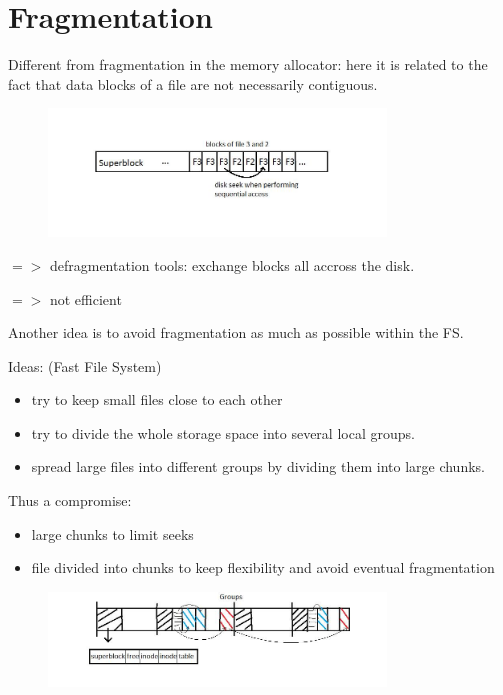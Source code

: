 \documentclass[a4paper,10pt]{report}
\newlength{\larg}
\begin{document}
\section{Fragmentation}

Different from fragmentation in the memory allocator: here it is related to the fact that data blocks of a file are not necessarily contiguous.

 \begin{figure}[h!]
  \begin{center}
    \includegraphics[width=0.8\textwidth]{fragmentation.jpg}
  \end{center}
\end{figure}

$=>$ defragmentation tools: exchange blocks all accross the disk.

$=>$ not efficient

Another idea is to avoid fragmentation as much as possible within the FS.

Ideas: (Fast File System)
\begin{itemize}
  \item  try to keep small files close to each other
  \item try to divide the whole storage space into several local groups.
  \item spread large files into different groups by dividing them into large chunks.
\end{itemize}

Thus a compromise:
\begin{itemize}
  \item large chunks to limit seeks
  \item file divided into chunks to keep flexibility and avoid eventual fragmentation
\end{itemize}

\begin{figure}[h!]
  \begin{center}
    \includegraphics[width=0.8\textwidth]{fragmentation_2.jpg}
  \end{center}
\end{figure}
\end{document}
